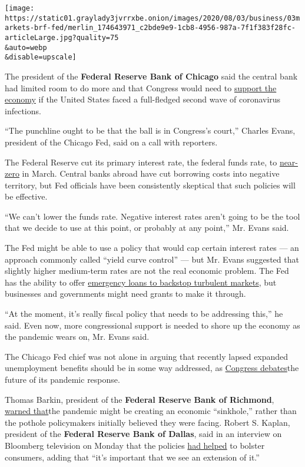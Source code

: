 \texttt{[image: https://static01.graylady3jvrrxbe.onion/images/2020/08/03/business/03markets-brf-fed/merlin\_174643971\_c2bde9e9-1cb8-4956-987a-7f1f383f28fc-articleLarge.jpg?quality=75\\\&auto=webp\\\&disable=upscale]}

The president of the \textbf{Federal Reserve Bank of Chicago} said the
central bank had limited room to do more and that Congress would need to
\href{https://www.nytimes3xbfgragh.onion/2020/08/03/business/fed-official-says-a-hard-lockdown-could-get-virus-under-control.html}{support
the economy} if the United States faced a full-fledged second wave of
coronavirus infections.

``The punchline ought to be that the ball is in Congress's court,''
Charles Evans, president of the Chicago Fed, said on a call with
reporters.

The Federal Reserve cut its primary interest rate, the federal funds
rate, to
\href{https://www.nytimes3xbfgragh.onion/2020/07/29/business/economy/federal-reserve-meeting-interest-rates.html}{near-zero}
in March. Central banks abroad have cut borrowing costs into negative
territory, but Fed officials have been consistently skeptical that such
policies will be effective.

``We can't lower the funds rate. Negative interest rates aren't going to
be the tool that we decide to use at this point, or probably at any
point,'' Mr. Evans said.

The Fed might be able to use a policy that would cap certain interest
rates --- an approach commonly called ``yield curve control'' --- but
Mr. Evans suggested that slightly higher medium-term rates are not the
real economic problem. The Fed has the ability to offer
\href{https://www.nytimes3xbfgragh.onion/2020/07/28/business/economy/coronavirus-federal-reserve-policy.html}{emergency
loans to backstop turbulent markets}, but businesses and governments
might need grants to make it through.

``At the moment, it's really fiscal policy that needs to be addressing
this,'' he said. Even now, more congressional support is needed to shore
up the economy as the pandemic wears on, Mr. Evans said.

The Chicago Fed chief was not alone in arguing that recently lapsed
expanded unemployment benefits should be in some way addressed, as
\href{https://www.nytimes3xbfgragh.onion/2020/08/02/us/politics/coronavirus-jobless-aid.html}{Congress
debates}the future of its pandemic response.

Thomas Barkin, president of the \textbf{Federal Reserve Bank of
Richmond},
\href{https://www.reuters.com/article/usa-fed-barkin/feds-barkin-says-economy-faces-sinkhole-without-more-fiscal-support-idUSW1N2B8003}{warned
that}the pandemic might be creating an economic ``sinkhole,'' rather
than the pothole policymakers initially believed they were facing.
Robert S. Kaplan, president of the \textbf{Federal Reserve Bank of
Dallas}, said in an interview on Bloomberg television on Monday that the
policies
\href{https://www.bloomberg.com/news/articles/2020-08-03/extension-of-jobless-benefits-to-buoy-growth-fed-s-kaplan-says?srnd=premium\&sref=oZtxD6sa}{had
helped} to bolster consumers, adding that ``it's important that we see
an extension of it.''

